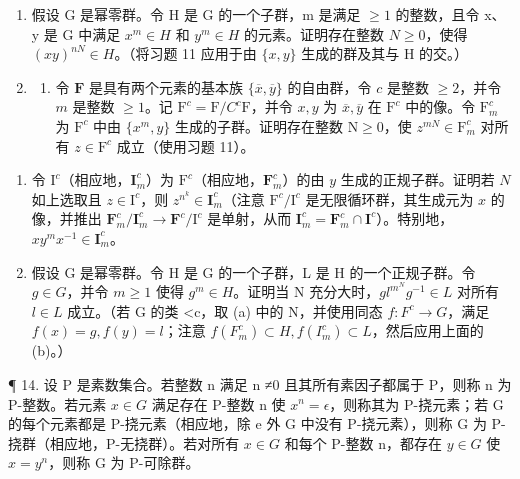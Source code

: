 \begin{enumerate}
\def\labelenumi{\arabic{enumi}.}
\setcounter{enumi}{11}
\item
  假设 G 是幂零群。令 H 是 G 的一个子群，m 是满足 \(\geqslant 1\) 的整数，且令 x、y 是 G 中满足 \(x^{m} \in H\) 和 \(y^{m} \in H\) 的元素。证明存在整数 \(N \geqslant 0\)，使得 \((xy)^{nN} \in H\)。（将习题 11 应用于由 \(\{x, y\}\) 生成的群及其与 H 的交。）
\item
  \begin{enumerate}
  \def\labelenumii{(\alph{enumii})}
  \tightlist
  \item
    令 \(\mathbf{F}\) 是具有两个元素的基本族 \(\{\overline{x},\overline{y}\}\) 的自由群，令 \(c\) 是整数 \(\geqslant 2\)，并令 \(m\) 是整数 \(\geqslant 1\)。记 \(\mathrm{F}^c = \mathrm{F} / C^c\mathrm{F}\)，并令 \(x,y\) 为 \(\overline{x},\overline{y}\) 在 \(\mathrm{F}^c\) 中的像。令 \(\mathrm{F}_m^c\) 为 \(\mathrm{F}^c\) 中由 \(\{x^{m},y\}\) 生成的子群。证明存在整数 \(\mathrm{N}\geqslant 0\)，使 \(z^{mN}\in \mathrm{F}_{m}^{c}\) 对所有 \(z\in \mathrm{F}^c\) 成立（使用习题 11）。
  \end{enumerate}
\end{enumerate}

\begin{enumerate}
\def\labelenumi{(\alph{enumi})}
\setcounter{enumi}{1}
\item
  令 \(\mathrm{I}^c\)（相应地，\(\mathbf{I}_m^c\)）为 \(\mathrm{F}^c\)（相应地，\(\mathbf{F}_m^c\)）的由 \(y\) 生成的正规子群。证明若 \(N\) 如上选取且 \(z \in \mathrm{I}^c\)，则 \(z^{n^k} \in \mathbf{I}_m^c\)（注意 \(\mathrm{F}^c / \mathrm{I}^c\) 是无限循环群，其生成元为 \(x\) 的像，并推出 \(\mathbf{F}_m^c / \mathbf{I}_m^c \to \mathbf{F}^c / \mathrm{I}^c\) 是单射，从而 \(\mathbf{I}_m^c = \mathbf{F}_m^c \cap \mathbf{I}^c\)）。特别地，\(xy^m x^{-1} \in \mathbf{I}_m^c\)。
\item
  假设 G 是幂零群。令 H 是 G 的一个子群，L 是 H 的一个正规子群。令 \(g \in G\)，并令 \(m \geqslant 1\) 使得 \(g^{m} \in H\)。证明当 N 充分大时，\(gl^{m^{N}} g^{-1} \in L\) 对所有 \(l \in L\) 成立。（若 G 的类 \textless c，取 (a) 中的 N，并使用同态 \(f: F^{c} \to G\)，满足 \(f(x) = g, f(y) = l\)；注意 \(f(F_{m}^{c}) \subset H, f(I_{m}^{c}) \subset L\)，然后应用上面的 (b)。）
\end{enumerate}

¶ 14. 设 P 是素数集合。若整数 n 满足 n ≠0 且其所有素因子都属于 P，则称 n 为 P-整数。若元素 \(x \in G\) 满足存在 P-整数 n 使 \(x^{n} = \epsilon\)，则称其为 P-挠元素；若 G 的每个元素都是 P-挠元素（相应地，除 e 外 G 中没有 P-挠元素），则称 G 为 P-挠群（相应地，P-无挠群）。若对所有 \(x \in G\) 和每个 P-整数 n，都存在 \(y \in G\) 使 \(x = y^{n}\)，则称 G 为 P-可除群。

